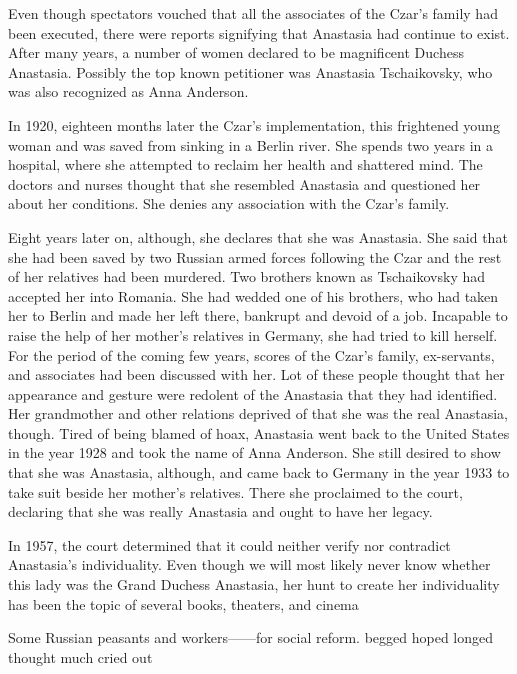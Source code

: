    Even though spectators vouched that all the associates of the Czar's family had been executed, there were reports signifying that Anastasia had continue to exist. After many years, a number of women declared to be magnificent Duchess Anastasia. Possibly the top known petitioner was Anastasia Tschaikovsky, who was also recognized as Anna Anderson.

    In 1920, eighteen months later the Czar's implementation, this frightened young woman and was saved from sinking in a Berlin river. She spends two years in a hospital, where she attempted to reclaim her health and shattered mind. The doctors and nurses thought that she resembled Anastasia and questioned her about her conditions. She denies any association with the Czar's family.

    Eight years later on, although, she declares that she was Anastasia. She said that she had been saved by two Russian armed forces following the Czar and the rest of her relatives had been murdered. Two brothers known as Tschaikovsky had accepted her into Romania. She had wedded one of his brothers, who had taken her to Berlin and made her left there, bankrupt and devoid of a job. Incapable to raise the help of her mother's relatives in Germany, she had tried to kill herself. For the period of the coming few years, scores of the Czar's family, ex-servants, and associates had been discussed with her. Lot of these people thought that her appearance and gesture were redolent of the Anastasia that they had identified. Her grandmother and other relations deprived of that she was the real Anastasia, though. Tired of being blamed of hoax, Anastasia went back to the United States in the year 1928 and took the name of Anna Anderson. She still desired to show that she was Anastasia, although, and came back to Germany in the year 1933 to take suit beside her mother's relatives. There she proclaimed to the court, declaring that she was really Anastasia and ought to have her legacy.

    In 1957, the court determined that it could neither verify nor contradict Anastasia's individuality. Even though we will most likely never know whether this lady was the Grand Duchess Anastasia, her hunt to create her individuality has been the topic of several books, theaters, and cinema

        Some Russian peasants and workers------for social reform.
            begged
            hoped
            longed
            thought much
            cried out 

